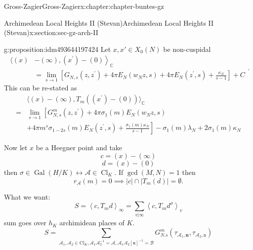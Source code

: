 \documentclass[oneside,10pt,]{book}
\numberwithin{equation}{section}
\newcommand{\pair}[2]{\left\langle #1, #2 \right\rangle}
\DeclareMathOperator{\Cl}{Cl}
\newcommand{\Gal}[2]{\operatorname{Gal}(#1/#2)}
\newcommand{\amp}{&}
\begin{document}
\begin{chapterptx}{Gross-Zagier}{}{Gross-Zagier}{}{}{x:chapter:chapter-buntes-gz}
\begin{sectionptx}{Archimedean Local Heights II (Stevan)}{}{Archimedean Local Heights II (Stevan)}{}{}{x:section:sec-gz-arch-II}
\begin{proposition}{}{}{g:proposition:idm493644197424}
Let \(x,x'\in X_0(N)\) be non-cuspidal%
\begin{equation*}
\begin{aligned}\langle(x)\amp\left.-(\infty),\left(x^{\prime}\right)-(0)\right\rangle_{\mathbb{C}} \\ \amp=\lim _{s \rightarrow 1}\left[G_{N, s}\left(z, z^{\prime}\right)+4 \pi E_{N}\left(w_{N} z, s\right)+4 \pi E_{N}\left(z^{\prime}, s\right)+\frac{\kappa_{N}}{s-1}\right]+C \end{aligned}\text{.}
\end{equation*}
This can be re-stated as%
\begin{equation*}
\begin{aligned}\amp\langle(x)-(\infty), T_{m}\left(\left(x^{\prime}\right)-(0)\right)\rangle_{\mathbb{C}} \\=\amp \lim _{s \rightarrow 1}\left[G_{N, s}^{m}\left(z, z^{\prime}\right)+4 \pi \sigma_{1}(m) E_{N}\left(w_{N} z, s\right)\right.\\ \amp\left.+4 \pi m^{s} \sigma_{1-2 s}(m) E_{N}\left(z^{\prime}, s\right)+\frac{\sigma_{1}(m) \kappa_{N}}{s-1}\right]-\sigma_{1}(m) \lambda_{N}+2 \sigma_{1}(m) \kappa_{N} \end{aligned}
\end{equation*}
%
\end{proposition}
Now let \(x\) be a Heegner point and take%
\begin{equation*}
c= (x)  - (\infty )
\end{equation*}
%
\begin{equation*}
d = (x)-(0)
\end{equation*}
then \(\sigma \in \Gal HK \leftrightarrow \mathscr A\in \Cl_K\). If \(\gcd(M,N) = 1\) then%
\begin{equation*}
r_{\mathscr A} (m ) = 0 \implies |c| \cap |T_m (d)| = \emptyset\text{.}
\end{equation*}
%
\par
What we want:%
\begin{equation*}
S = \pair c {T_md}_\infty  = \sum_{v|\infty } \pair c {T_md^\sigma }_v
\end{equation*}
sum goes over \(h_K\) archimidean places of \(K\).%
\begin{equation*}
S = \sum_{\mathscr{A}_{1}, \mathscr{A}_{2} \in \mathrm{Cl}_{K} , \mathscr{A}_{1} \mathscr{A}_{2}^{-1}=\mathscr{A}, \mathscr{A}_{1} \mathscr{A}_{2}[\mathfrak{n}]^{-1}=\mathscr{B}} G_{N . s}^{m}\left(\tau_{\mathscr{A}_{1}, \mathbf{n}}, \tau_{\mathscr{A}_{2}, \mathrm{n}}\right)
\end{equation*}

\end{sectionptx}
\end{chapterptx}
\end{document}
